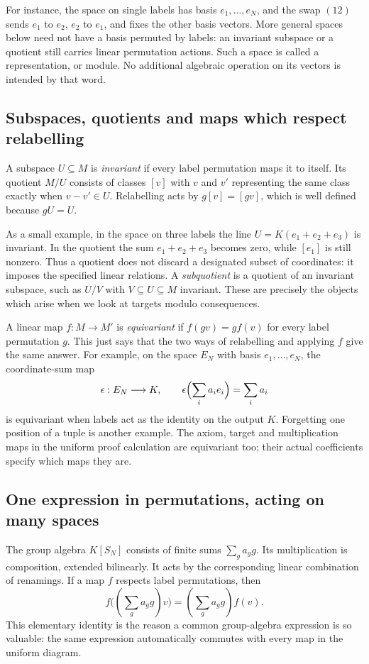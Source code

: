 For instance, the space on single labels has basis
$e_1,\ldots,e_N$, and the swap $(12)$ sends $e_1$ to $e_2$,
$e_2$ to $e_1$, and fixes the other basis vectors. More general
spaces below need not have a basis permuted by labels: an invariant
subspace or a quotient still carries linear permutation actions.
Such a space is called a representation, or module. No additional
algebraic operation on its vectors is intended by that word.

\subsection*{Subspaces, quotients and maps which respect relabelling}
A subspace $U\subseteq M$ is \emph{invariant} if every label
permutation maps it to itself. Its quotient $M/U$ consists of classes
$[v]$ with $v$ and $v'$ representing the same class exactly when
$v-v'\in U$. Relabelling acts by $g[v]=[gv]$, which is well defined
because $gU=U$.

As a small example, in the space on three labels the line
$U=K(e_1+e_2+e_3)$ is invariant. In the quotient the sum
$e_1+e_2+e_3$ becomes zero, while $[e_1]$ is still nonzero.
Thus a quotient does not discard a designated subset of coordinates:
it imposes the specified linear relations. A \emph{subquotient} is
a quotient of an invariant subspace, such as $U/V$ with
$V\subseteq U\subseteq M$ invariant. These are precisely the
objects which arise when we look at targets modulo consequences.

A linear map $f:M\to M'$ is \emph{equivariant} if
$f(gv)=g f(v)$ for every label permutation $g$. This just says that
the two ways of relabelling and applying $f$ give the same answer.
For example, on the space $E_N$ with basis $e_1,\ldots,e_N$,
the coordinate-sum map
\[
 \epsilon:E_N\longrightarrow K,
                 \qquad\epsilon\Bigl(\sum_i a_i e_i\Bigr)=\sum_i a_i
\]
is equivariant when labels act as the identity on the output $K$.
Forgetting one position of a tuple is another example. The axiom,
target and multiplication maps in the uniform proof calculation are
equivariant too; their actual coefficients specify which maps they are.

\subsection*{One expression in permutations, acting on many spaces}
The group algebra $K[S_N]$ consists of finite sums $\sum_g a_g g$.
Its multiplication is composition, extended bilinearly. It acts by the
corresponding linear combination of renamings. If a map
$f$ respects label permutations, then
\[
                           f\bigl((\sum_g a_gg)v\bigr)
                                      = (\sum_g a_gg)f(v).
\]
This elementary identity is the reason a common group-algebra expression
is so valuable: the same expression automatically commutes with every
map in the uniform diagram.

